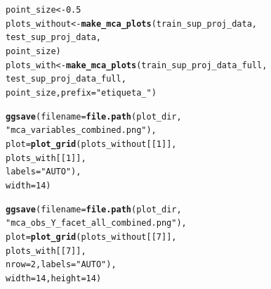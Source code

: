 \documentclass{article}\usepackage[]{graphicx}\usepackage[]{color}
\makeatletter
\newcommand{\hlnum}[1]{\textcolor[rgb]{0.686,0.059,0.569}{#1}}%
\newcommand{\hlstr}[1]{\textcolor[rgb]{0.192,0.494,0.8}{#1}}%
\newcommand{\hlstd}[1]{\textcolor[rgb]{0.345,0.345,0.345}{#1}}%
\newcommand{\hlkwb}[1]{\textcolor[rgb]{0.69,0.353,0.396}{#1}}%
\newcommand{\hlkwc}[1]{\textcolor[rgb]{0.333,0.667,0.333}{#1}}%
\newcommand{\hlkwd}[1]{\textcolor[rgb]{0.737,0.353,0.396}{\textbf{#1}}}%
\newenvironment{kframe}{%
 \def\at@end@of@kframe{}%
 \ifinner\ifhmode%
  \def\at@end@of@kframe{\end{minipage}}%
  \begin{minipage}{\columnwidth}%
 \fi\fi%
 \def\FrameCommand##1{\hskip\@totalleftmargin \hskip-\fboxsep
 \colorbox{shadecolor}{##1}\hskip-\fboxsep
     \hskip-\linewidth \hskip-\@totalleftmargin \hskip\columnwidth}%
 \MakeFramed {\advance\hsize-\width
   \@totalleftmargin\z@ \linewidth\hsize
   \@setminipage}}%
 {\par\unskip\endMakeFramed%
 \at@end@of@kframe}
\newenvironment{knitrout}{}{} %
\makeatother
\begin{document}
\begin{knitrout}
\color{fgcolor}\begin{kframe}
\begin{alltt}
\hlstd{point_size} \hlkwb{<-} \hlnum{0.5}
\hlstd{plots_without} \hlkwb{<-} \hlkwd{make_mca_plots}\hlstd{(train_sup_proj_data,}
    \hlstd{test_sup_proj_data,}
    \hlstd{point_size)}
\hlstd{plots_with} \hlkwb{<-} \hlkwd{make_mca_plots}\hlstd{(train_sup_proj_data_full,}
    \hlstd{test_sup_proj_data_full,}
    \hlstd{point_size,} \hlkwc{prefix} \hlstd{=} \hlstr{"etiqueta_"}\hlstd{)}
\end{alltt}


{\ttfamily\noindent\bfseries\color{errorcolor}{\#\# Error in ggplot(data = train\$vars, aes(x = Dim.1, y = Dim.2, col = Type)): object 'train\_sup\_proj\_data\_full' not found}}\begin{alltt}
\hlkwd{ggsave}\hlstd{(}\hlkwc{filename} \hlstd{=} \hlkwd{file.path}\hlstd{(plot_dir,}
    \hlstr{"mca_variables_combined.png"}\hlstd{),}
    \hlkwc{plot} \hlstd{=} \hlkwd{plot_grid}\hlstd{(plots_without[[}\hlnum{1}\hlstd{]],}
        \hlstd{plots_with[[}\hlnum{1}\hlstd{]],}
        \hlkwc{labels} \hlstd{=} \hlstr{"AUTO"}\hlstd{),}
    \hlkwc{width} \hlstd{=} \hlnum{14}\hlstd{)}
\end{alltt}


{\ttfamily\noindent\bfseries{}}\begin{alltt}
\hlkwd{ggsave}\hlstd{(}\hlkwc{filename} \hlstd{=} \hlkwd{file.path}\hlstd{(plot_dir,}
    \hlstr{"mca_obs_Y_facet_all_combined.png"}\hlstd{),}
    \hlkwc{plot} \hlstd{=} \hlkwd{plot_grid}\hlstd{(plots_without[[}\hlnum{7}\hlstd{]],}
        \hlstd{plots_with[[}\hlnum{7}\hlstd{]],}
        \hlkwc{nrow} \hlstd{=} \hlnum{2}\hlstd{,} \hlkwc{labels} \hlstd{=} \hlstr{"AUTO"}\hlstd{),}
    \hlkwc{width} \hlstd{=} \hlnum{14}\hlstd{,} \hlkwc{height} \hlstd{=} \hlnum{14}\hlstd{)}
\end{alltt}


{\ttfamily\noindent\bfseries{}}\end{kframe}
\end{knitrout}
\end{document}
